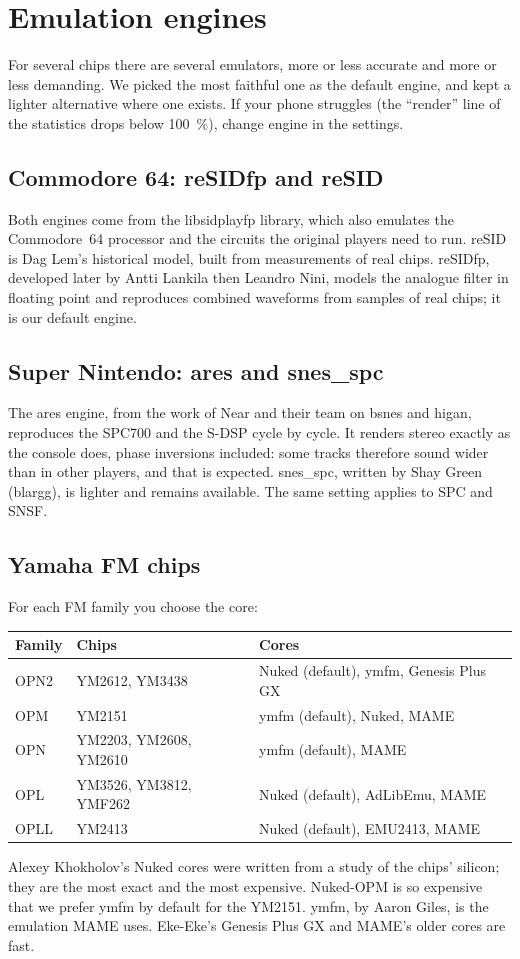 \chapter{Emulation engines}

For several chips there are several emulators, more or less accurate and more or less demanding. We picked the most
faithful one as the default engine, and kept a lighter alternative where one exists. If your phone struggles (the
``render'' line of the statistics drops below 100~\%), change engine in the settings.

\section{Commodore 64: reSIDfp and reSID}
Both engines come from the libsidplayfp library, which also emulates the Commodore~64 processor and the circuits the
original players need to run. reSID is Dag Lem's historical model, built from measurements of real chips. reSIDfp,
developed later by Antti Lankila then Leandro Nini, models the analogue filter in floating point and reproduces
combined waveforms from samples of real chips; it is our default engine.

\section{Super Nintendo: ares and snes\_spc}
The ares engine, from the work of Near and their team on bsnes and higan, reproduces the SPC700 and the S-DSP cycle
by cycle. It renders stereo exactly as the console does, phase inversions included: some tracks therefore sound wider
than in other players, and that is expected. snes\_spc, written by Shay Green (blargg), is lighter and remains
available. The same setting applies to SPC and SNSF.

\section{Yamaha FM chips}
For each FM family you choose the core:
\begin{longtable}{@{}l l p{}@{}}
\toprule \textbf{Family} & \textbf{Chips} & \textbf{Cores} \\ \midrule
OPN2 & YM2612, YM3438 & Nuked (default), ymfm, Genesis Plus GX \\
OPM & YM2151 & ymfm (default), Nuked, MAME \\
OPN & YM2203, YM2608, YM2610 & ymfm (default), MAME \\
OPL & YM3526, YM3812, YMF262 & Nuked (default), AdLibEmu, MAME \\
OPLL & YM2413 & Nuked (default), EMU2413, MAME \\
\bottomrule
\end{longtable}
Alexey Khokholov's Nuked cores were written from a study of the chips' silicon; they are the most exact and the most
expensive. Nuked-OPM is so expensive that we prefer ymfm by default for the YM2151. ymfm, by Aaron Giles, is the emulation MAME uses. Eke-Eke's Genesis Plus GX and MAME's older cores are
fast.


